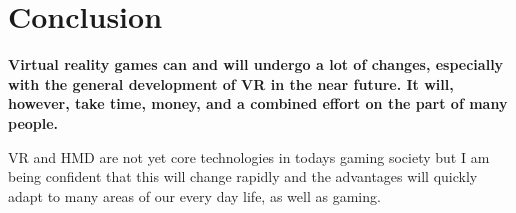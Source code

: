 \section{Conclusion}
\textbf{Virtual reality games can and will undergo a lot of changes, especially with the general development of VR in the near future. It will, however, take time, money, and a combined effort on the part of many people.}

VR and HMD are not yet core technologies in todays gaming society but I am being confident that this will change rapidly and the advantages will quickly adapt to many areas of our every day life, as well as gaming.